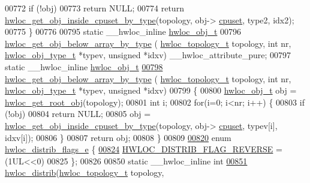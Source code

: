 \begin{DoxyCode}
00772   \textcolor{keywordflow}{if} (!obj)
00773     \textcolor{keywordflow}{return} NULL;
00774   \textcolor{keywordflow}{return} \hyperlink{a00195_ga2edf924e5a0cca9cb22f65cc77c6ddb5}{hwloc\_get\_obj\_inside\_cpuset\_by\_type}(topology, obj->
      \hyperlink{a00238_a67925e0f2c47f50408fbdb9bddd0790f}{cpuset}, type2, idx2);
00775 \}
00776 
00795 \textcolor{keyword}{static} \_\_hwloc\_inline \hyperlink{a00238}{hwloc\_obj\_t}
00796 \hyperlink{a00200_gacb51295ff3fbd3a96f990f20c6492b1d}{hwloc\_get\_obj\_below\_array\_by\_type} (
      \hyperlink{a00186_ga9d1e76ee15a7dee158b786c30b6a6e38}{hwloc\_topology\_t} topology, \textcolor{keywordtype}{int} nr, \hyperlink{a00184_gacd37bb612667dc437d66bfb175a8dc55}{hwloc\_obj\_type\_t} *typev, \textcolor{keywordtype}{unsigned} *idxv)
       \_\_hwloc\_attribute\_pure;
00797 \textcolor{keyword}{static} \_\_hwloc\_inline \hyperlink{a00238}{hwloc\_obj\_t}
\hyperlink{a00200_gacb51295ff3fbd3a96f990f20c6492b1d}{00798} \hyperlink{a00200_gacb51295ff3fbd3a96f990f20c6492b1d}{hwloc\_get\_obj\_below\_array\_by\_type} (
      \hyperlink{a00186_ga9d1e76ee15a7dee158b786c30b6a6e38}{hwloc\_topology\_t} topology, \textcolor{keywordtype}{int} nr, \hyperlink{a00184_gacd37bb612667dc437d66bfb175a8dc55}{hwloc\_obj\_type\_t} *typev, \textcolor{keywordtype}{unsigned} *idxv)
00799 \{
00800   \hyperlink{a00238}{hwloc\_obj\_t} obj = \hyperlink{a00187_ga2d4b12fc187dfc53b35f2fa21d21044d}{hwloc\_get\_root\_obj}(topology);
00801   \textcolor{keywordtype}{int} i;
00802   \textcolor{keywordflow}{for}(i=0; i<nr; i++) \{
00803     \textcolor{keywordflow}{if} (!obj)
00804       \textcolor{keywordflow}{return} NULL;
00805     obj = \hyperlink{a00195_ga2edf924e5a0cca9cb22f65cc77c6ddb5}{hwloc\_get\_obj\_inside\_cpuset\_by\_type}(topology, obj->
      \hyperlink{a00238_a67925e0f2c47f50408fbdb9bddd0790f}{cpuset}, typev[i], idxv[i]);
00806   \}
00807   \textcolor{keywordflow}{return} obj;
00808 \}
00809 
\hyperlink{a00201_ga8b835295a52b6768a5e6c8abb1f9c54d}{00820} \textcolor{keyword}{enum} \hyperlink{a00201_ga8b835295a52b6768a5e6c8abb1f9c54d}{hwloc\_distrib\_flags\_e} \{
\hyperlink{a00201_gga8b835295a52b6768a5e6c8abb1f9c54da2ca08404bfbebe9ed5f34c3d7635425a}{00824}   \hyperlink{a00201_gga8b835295a52b6768a5e6c8abb1f9c54da2ca08404bfbebe9ed5f34c3d7635425a}{HWLOC\_DISTRIB\_FLAG\_REVERSE} = (1UL<<0)
00825 \};
00826 
00850 \textcolor{keyword}{static} \_\_hwloc\_inline \textcolor{keywordtype}{int}
\hyperlink{a00201_ga7b0c28f797c2ff17fa2f244ebbd55b33}{00851} \hyperlink{a00201_ga7b0c28f797c2ff17fa2f244ebbd55b33}{hwloc\_distrib}(\hyperlink{a00186_ga9d1e76ee15a7dee158b786c30b6a6e38}{hwloc\_topology\_t} topology,

\end{DoxyCode}
